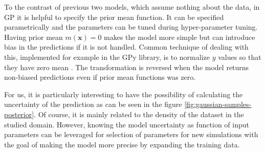 To the contrast of previous two models, which assume nothing about the data, in GP it is helpful to specify the prior mean function. It can be specified parametrically and the parameters can be tuned during hyper-parameter tuning. Having prior mean $m(\bm{x}) = 0$ makes the model more simple but can introduce bias in the predictions if it is not handled. Common technique of dealing with this, implemented for example in the GPy library, is to normalize $y$ values so that they have zero mean \cite{gpy}. The transformation is reversed when the model returns non-biased predictions even if prior mean functions was zero.

For us, it is particularly interesting to have the possibility of calculating the uncertainty of the prediction as can be seen in the figure \ref{fig:gaussian-samples-posterior}. Of course, it is mainly related to the density of the dataset in the studied domain. However, knowing the model uncertainty as function of input parameters can be leveraged for selection of parameters for new simulations with the goal of making the model more precise by expanding the training data.

